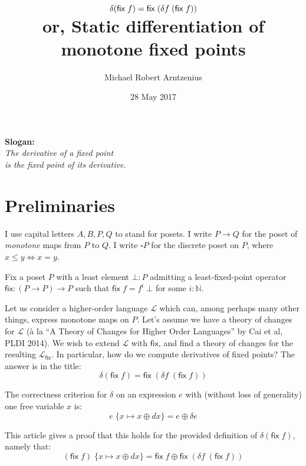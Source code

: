 \documentclass[a5,libertine]{rntz}
\title{$\dv(\fix\;f) = \fix\;(\dv{f} \; (\fix\;f))$
\\
\large or, Static differentiation of monotone fixed points}
\author{Michael Robert Arntzenius}
\date{28 May 2017}
\newcommand{\ms}[1]{\ensuremath{\mathsf{#1}}}
\newcommand{\mc}[1]{\ensuremath{\mathcal{#1}}}
\newcommand{\N}{\mathbb{N}}
\newcommand{\sub}[1]{\;\{{#1}\}}
\newcommand{\Disc}[1]{\square{#1}}
\newcommand{\fix}{\ms{fix}}
\newcommand{\dv}{\delta}
\begin{document}
\maketitle

\begin{center}
  \large
  \textbf{Slogan:}\\
  \it The derivative of a fixed point\\
  is the fixed point of its derivative.
\end{center}

\section{Preliminaries}

I use capital letters $A, B, P, Q$ to stand for posets. I write $P \to Q$ for
the poset of \emph{monotone} maps from $P$ to $Q$. I write $\Disc{P}$ for the
discrete poset on $P$, where $x \le y \iff x = y$.

Fix a poset $P$ with a least element $\bot : P$ admitting a least-fixed-point
operator $\fix : (P \to P) \to P$ such that $\fix\;f = f^i\;\bot$ for some $i :
\N$.

Let us consider a higher-order language $\mc{L}$ which can, among perhaps many
other things, express monotone maps on $P$. Let's assume we have a theory of
changes for $\mc{L}$ (\`a la ``A Theory of Changes for Higher Order Languages''
by Cai et al, PLDI 2014). We wish to extend $\mc{L}$ with $\fix$, and find a
theory of changes for the resulting $\mc{L}_\fix$. In particular, how do we
compute derivatives of fixed points? The answer is in the title:
\[ \dv(\fix\;f) = \fix\;(\dv{f} \; (\fix\;f)) \]


The correctness criterion for $\dv$ on an expression $e$ with (without loss of
generality) one free variable $x$ is:
\begin{equation}
  e \sub{x \mapsto x \oplus dx} = e \oplus \dv e
  \label{eqn:correctness}
\end{equation}

This article gives a proof that this holds for the provided definition of
$\dv(\fix\;f)$, namely that:
\[ (\fix\;f) \sub{x \mapsto x \oplus dx} = \fix\;f \oplus \fix\;(\dv f \; (\fix\;f)) \]
\end{document}
